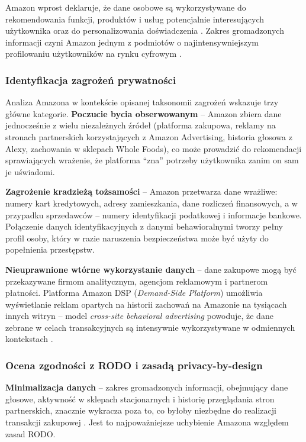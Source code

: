 \documentclass[12pt, a4paper]{article}
\begin{document}
Amazon wprost deklaruje, że dane osobowe są wykorzystywane do rekomendowania funkcji, produktów i usług potencjalnie interesujących użytkownika oraz do personalizowania doświadczenia \cite{amazon_privacy}. Zakres gromadzonych informacji czyni Amazon jednym z podmiotów o najintensywniejszym profilowaniu użytkowników na rynku cyfrowym \cite{chen2025, himeur2022}.

\subsubsection{Identyfikacja zagrożeń prywatności}

Analiza Amazona w kontekście opisanej taksonomii zagrożeń \cite{chen2025} wskazuje trzy główne kategorie. \textbf{Poczucie bycia obserwowanym} -- Amazon zbiera dane jednocześnie z wielu niezależnych źródeł (platforma zakupowa, reklamy na stronach partnerskich korzystających z Amazon Advertising, historia głosowa z Alexy, zachowania w sklepach Whole Foods), co może prowadzić do rekomendacji sprawiających wrażenie, że platforma ``zna'' potrzeby użytkownika zanim on sam je uświadomi.

\textbf{Zagrożenie kradzieżą tożsamości} -- Amazon przetwarza dane wrażliwe: numery kart kredytowych, adresy zamieszkania, dane rozliczeń finansowych, a w przypadku sprzedawców -- numery identyfikacji podatkowej i informacje bankowe. Połączenie danych identyfikacyjnych z danymi behawioralnymi tworzy pełny profil osoby, który w razie naruszenia bezpieczeństwa może być użyty do popełnienia przestępstw.

\textbf{Nieuprawnione wtórne wykorzystanie danych} -- dane zakupowe mogą być przekazywane firmom analitycznym, agencjom reklamowym i partnerom płatności. Platforma Amazon DSP (\textit{Demand-Side Platform}) \cite{amazon_dsp} umożliwia wyświetlanie reklam opartych na historii zachowań na Amazonie na tysiącach innych witryn -- model \textit{cross-site behavioral advertising} powoduje, że dane zebrane w celach transakcyjnych są intensywnie wykorzystywane w odmiennych kontekstach \cite{amazon_dsp, rodo}.

\subsubsection{Ocena zgodności z RODO i zasadą privacy-by-design}

\textbf{Minimalizacja danych} -- zakres gromadzonych informacji, obejmujący dane głosowe, aktywność w sklepach stacjonarnych i historię przeglądania stron partnerskich, znacznie wykracza poza to, co byłoby niezbędne do realizacji transakcji zakupowej \cite{amazon_privacy, rodo}. Jest to najpoważniejsze uchybienie Amazona względem zasad RODO.
\end{document}
